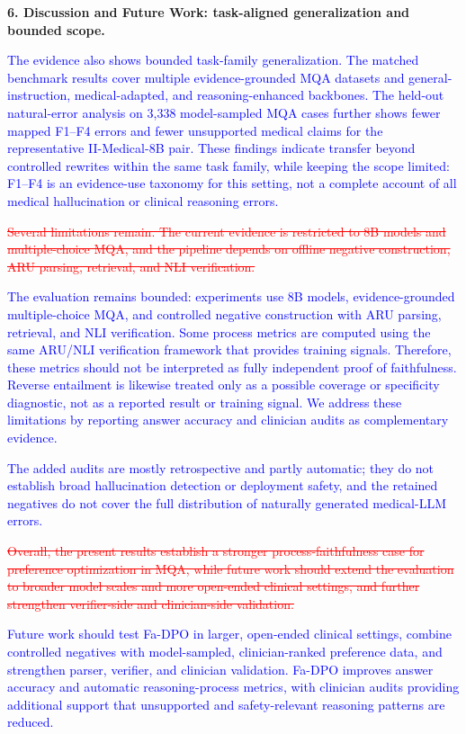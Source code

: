 \documentclass[12pt]{article}
\newcommand{\deleted}[1]{\textcolor{red}{\sout{#1}}}
\newcommand{\added}[1]{\textcolor{blue}{#1}}
\begin{document}
\textbf{6. Discussion and Future Work: task-aligned generalization and bounded scope.}
\begin{displayquote}
\added{The evidence also shows bounded task-family generalization. The matched benchmark results cover multiple evidence-grounded MQA datasets and general-instruction, medical-adapted, and reasoning-enhanced backbones. The held-out natural-error analysis on 3,338 model-sampled MQA cases further shows fewer mapped F1--F4 errors and fewer unsupported medical claims for the representative II-Medical-8B pair. These findings indicate transfer beyond controlled rewrites within the same task family, while keeping the scope limited: F1--F4 is an evidence-use taxonomy for this setting, not a complete account of all medical hallucination or clinical reasoning errors.}

\deleted{Several limitations remain. The current evidence is restricted to 8B models and multiple-choice MQA, and the pipeline depends on offline negative construction, ARU parsing, retrieval, and NLI verification.}

\added{The evaluation remains bounded: experiments use 8B models, evidence-grounded multiple-choice MQA, and controlled negative construction with ARU parsing, retrieval, and NLI verification. Some process metrics are computed using the same ARU/NLI verification framework that provides training signals. Therefore, these metrics should not be interpreted as fully independent proof of faithfulness. Reverse entailment is likewise treated only as a possible coverage or specificity diagnostic, not as a reported result or training signal. We address these limitations by reporting answer accuracy and clinician audits as complementary evidence.}

\added{The added audits are mostly retrospective and partly automatic; they do not establish broad hallucination detection or deployment safety, and the retained negatives do not cover the full distribution of naturally generated medical-LLM errors.}

\deleted{Overall, the present results establish a stronger process-faithfulness case for preference optimization in MQA, while future work should extend the evaluation to broader model scales and more open-ended clinical settings, and further strengthen verifier-side and clinician-side validation.}

\added{Future work should test Fa-DPO in larger, open-ended clinical settings, combine controlled negatives with model-sampled, clinician-ranked preference data, and strengthen parser, verifier, and clinician validation. Fa-DPO improves answer accuracy and automatic reasoning-process metrics, with clinician audits providing additional support that unsupported and safety-relevant reasoning patterns are reduced.}
\end{displayquote}
\end{document}
